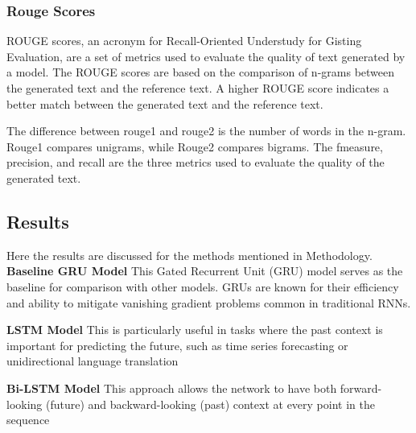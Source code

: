 \documentclass{article}
\begin{document}
\subsubsection{Rouge Scores}
ROUGE scores, an acronym for Recall-Oriented Understudy for Gisting Evaluation, are a set of metrics used to evaluate the quality of text generated by a model. The ROUGE scores are based on the comparison of n-grams between the generated text and the reference text. A higher ROUGE score indicates a better match between the generated text and the reference text.

The difference between rouge1 and rouge2 is the number of words in the n-gram. Rouge1 compares unigrams, while Rouge2 compares bigrams. The fmeasure, precision, and recall are the three metrics used to evaluate the quality of the generated text.

\subsection{Results}
Here the results are discussed for the methods mentioned in Methodology.
\textbf{Baseline GRU Model}
This Gated Recurrent Unit (GRU) model serves as the baseline for comparison with other models. GRUs are known for their efficiency and ability to mitigate vanishing gradient problems common in traditional RNNs.



\textbf{LSTM Model}
This is particularly useful in tasks where the past context is important for predicting the future, such as time series forecasting or unidirectional language translation





\textbf{Bi-LSTM Model}
This approach allows the network to have both forward-looking (future) and backward-looking (past) context at every point in the sequence

\end{document}
